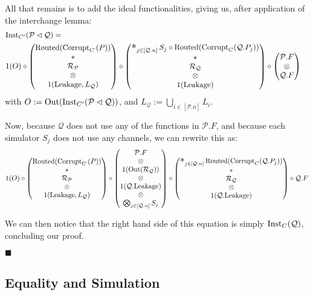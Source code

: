 \begin{theorem}
All that remains is to add the ideal functionalities, giving us,
after application of the interchange lemma:
$$
\begin{aligned}
  &\tx{Inst}_{C'}(\mathcal{P} \lhd \mathcal{Q}) =\cr
&1(O) \circ
\begin{pmatrix}
  \tx{Routed}(\tx{Corrupt}_{\tx{C'}}(P))\cr
  *\cr
  \mathcal{R}_{\mathcal{P}}\cr
  \otimes\cr
  1(\tx{Leakage}, L_{\mathcal{Q}})
\end{pmatrix}
\circ
\begin{pmatrix}
\bigast_{j \in [\mathcal{Q}.n]}
  S_j \circ \tx{Routed}(\tx{Corrupt}_C(\mathcal{Q}.P_j))
  \cr
  *\cr
  \mathcal{R}_{\mathcal{Q}}\cr
  \otimes\cr
  1(\tx{Leakage})
\end{pmatrix}
\circ
\begin{pmatrix}
  \mathcal{P}.F\cr
  \otimes\cr
  \mathcal{Q}.F
\end{pmatrix}
\end{aligned}
$$
with $O := \text{Out}(\text{Inst}_{C'}(\mathcal{P} \lhd \mathcal{Q}))$,
and $L_{\mathcal{Q}} := \bigcup_{i \in [\mathcal{P}.n]} L_i$.

Now, because $\mathcal{Q}$ does not use any of the functions
in $\mathcal{P}.F$, and because each simulator $S_j$
does not use any channels, we can rewrite this as:
$$
1(O) \circ
\begin{pmatrix}
  \tx{Routed}(\tx{Corrupt}_{\tx{C'}}(P))\cr
  *\cr
  \mathcal{R}_{\mathcal{P}}\cr
  \otimes\cr
  1(\tx{Leakage}, L_{\mathcal{Q}})
\end{pmatrix}
\circ
\begin{pmatrix}
  \mathcal{P}.F\cr
  \otimes\cr
  1(\tx{Out}(\mathcal{R}_{\mathcal{Q}}))\cr
  \otimes\cr
  1(\mathcal{Q}.\tx{Leakage})\cr
  \otimes\cr
  \bigotimes_{j \in [\mathcal{Q}.n]} S_j
\end{pmatrix}
\circ
\begin{pmatrix}
\bigast_{j \in [\mathcal{Q}.n]}
  \tx{Routed}(\tx{Corrupt}_C(\mathcal{Q}.P_j))
  \cr
  *\cr
  \mathcal{R}_{\mathcal{Q}}\cr
  \otimes\cr
  1(\mathcal{Q}.\tx{Leakage})
\end{pmatrix}
\circ
  \mathcal{Q}.F
$$

We can then notice that the right hand side of this equation
is simply $\text{Inst}_C(\mathcal{Q})$,
concluding our proof.

$\blacksquare$

\end{theorem}

\subsection{Equality and Simulation}

